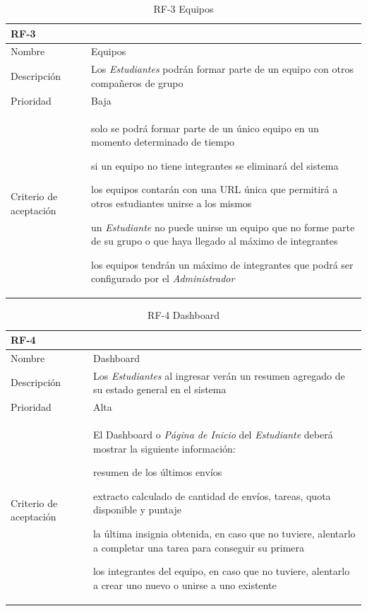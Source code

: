 \documentclass[11pt,spanish,listoffigures,listoftables]{tfgetsinf}
\begin{document}
\begin{table}
	\centering
	\begin{tabular}{ |p{4cm}||p{10cm}|  }
		\multicolumn{2}{l}{\textbf{RF-3}} \\
		\hline
		Nombre   & Equipos\\
		\hline
		Descripción  & Los \textit{Estudiantes} podrán formar parte de un equipo con otros compañeros de grupo  \\
		\hline
		Prioridad &  Baja\\
		\hline
		Criterio de aceptación & 
		\begin{tabitem}
			\item solo se podrá formar parte de un único equipo en un momento determinado de tiempo
			\item si un equipo no tiene integrantes se eliminará del sistema
			\item los equipos contarán con una URL única que permitirá a otros estudiantes unirse a los mismos
			\item un \textit{Estudiante} no puede unirse un equipo que no forme parte de su grupo o que haya llegado al máximo de integrantes
			\item los equipos tendrán un máximo de integrantes que podrá ser configurado por el \textit{Administrador}
		\end{tabitem} \\
		\hline
	\end{tabular}
	\caption{RF-3 Equipos}
	\label{table:3}
\end{table}


\begin{table}
	\centering
	\begin{tabular}{ |p{4cm}||p{10cm}|  }
		\multicolumn{2}{l}{\textbf{RF-4}} \\
		\hline
		Nombre   & \foreignlanguage{english}{Dashboard}\\
		\hline
		Descripción  & Los \textit{Estudiantes} al ingresar verán un resumen agregado de su estado general en el sistema   \\
		\hline
		Prioridad &  Alta\\
		\hline
		Criterio de aceptación & El \foreignlanguage{english}{Dashboard} o \textit{Página de Inicio} del \textit{Estudiante} deberá mostrar la siguiente información: \newline
		\begin{tabitem}
			\item resumen de los últimos envíos
			\item extracto calculado de cantidad de envíos, tareas, quota disponible y puntaje
			\item la última insignia obtenida, en caso que no tuviere, alentarlo a completar una tarea para conseguir su primera
			\item los integrantes del equipo, en caso que no tuviere, alentarlo a crear uno nuevo o unirse a uno existente
		\end{tabitem} \\
		\hline
	\end{tabular}
	\caption{RF-4 \foreignlanguage{english}{Dashboard}}
	\label{table:4}
\end{table}
\end{document}
